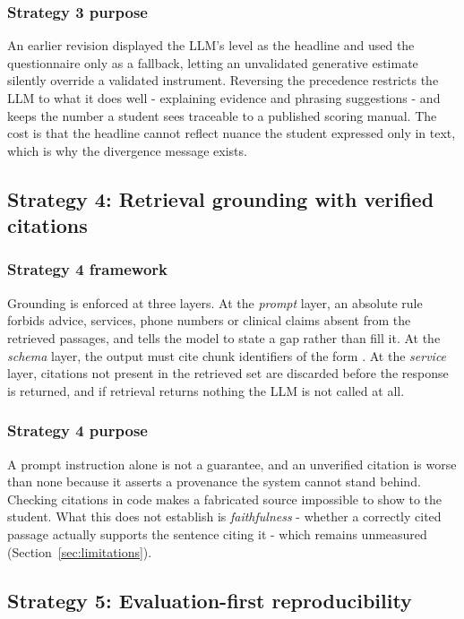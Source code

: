\subsubsection{Strategy 3 purpose}
An earlier revision displayed the LLM's level as the headline and used the questionnaire only as a fallback, letting an unvalidated generative estimate silently override a validated instrument. Reversing the precedence restricts the LLM to what it does well - explaining evidence and phrasing suggestions - and keeps the number a student sees traceable to a published scoring manual. The cost is that the headline cannot reflect nuance the student expressed only in text, which is why the divergence message exists.

\subsection{Strategy 4: Retrieval grounding with verified citations}
\subsubsection{Strategy 4 framework}
Grounding is enforced at three layers. At the \textit{prompt} layer, an absolute rule forbids advice, services, phone numbers or clinical claims absent from the retrieved passages, and tells the model to state a gap rather than fill it. At the \textit{schema} layer, the output must cite chunk identifiers of the form . At the \textit{service} layer, citations not present in the retrieved set are discarded before the response is returned, and if retrieval returns nothing the LLM is not called at all.

\subsubsection{Strategy 4 purpose}
A prompt instruction alone is not a guarantee, and an unverified citation is worse than none because it asserts a provenance the system cannot stand behind. Checking citations in code makes a fabricated source impossible to show to the student. What this does not establish is \textit{faithfulness} - whether a correctly cited passage actually supports the sentence citing it - which remains unmeasured (Section~\ref{sec:limitations}).

\subsection{Strategy 5: Evaluation-first reproducibility}
